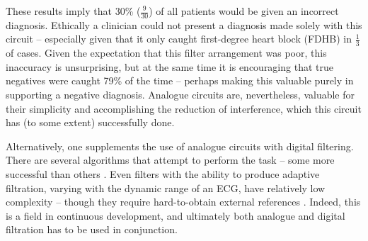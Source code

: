 These results imply that 30\% ($\frac{9}{30}$) of all patients would be given an incorrect diagnosis.
Ethically a clinician could not present a diagnosis made solely with this circuit -- especially given that it only caught first-degree heart block (FDHB) in $\frac{1}{3}$ of cases.
Given the expectation that this filter arrangement was poor, this inaccuracy is unsurprising, but at the same time it is encouraging that true negatives were caught 79\% of the time -- perhaps making this valuable purely in supporting a negative diagnosis.
Analogue circuits are, nevertheless, valuable for their simplicity and accomplishing the reduction of interference, which this circuit has (to some extent) successfully done.

Alternatively, one supplements the use of analogue circuits with digital filtering.
There are several algorithms that attempt to perform the task -- some more successful than others \citep{GarciaManuel2018Anwf}.
Even filters with the ability to produce adaptive filtration, varying with the dynamic range of an ECG, have relatively low complexity -- though they require hard-to-obtain external references \citep{GarciaManuel2018Anwf}.
Indeed, this is a field in continuous development, and ultimately both analogue and digital filtration has to be used in conjunction.